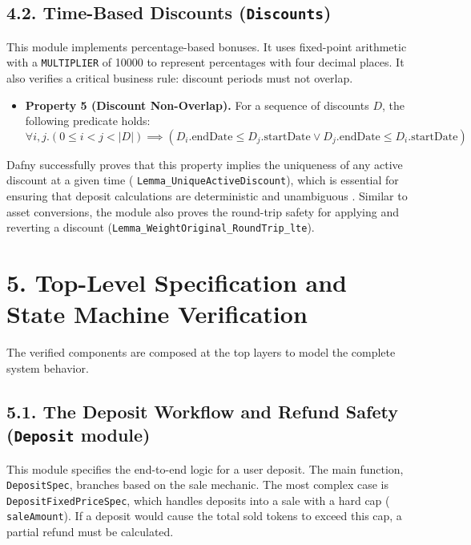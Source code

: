 \documentclass[
  english,
  onecolumn]{article}
\providecommand{\tightlist}{%
  \setlength{\itemsep}{0pt}\setlength{\parskip}{0pt}}
\begin{document}
\subsection{\texorpdfstring{4.2. Time-Based Discounts
(\texttt{Discounts})}{4.2. Time-Based Discounts (Discounts)}}\label{time-based-discounts-discounts}

This module implements percentage-based bonuses. It uses fixed-point
arithmetic with a \texttt{MULTIPLIER} of 10000 to represent percentages
with four decimal places. It also verifies a critical business rule:
discount periods must not overlap.

\begin{itemize}
\tightlist
\item
  \textbf{Property 5 (Discount Non-Overlap).} For a sequence of
  discounts \(D\), the following predicate holds:
  \[ \forall i, j. (0 \le i < j < |D|) \implies (D_i.\text{endDate} \le D_j.\text{startDate} \lor D_j.\text{endDate} \le D_i.\text{startDate}) \]
\end{itemize}

Dafny successfully proves that this property implies the uniqueness of
any active discount at a given time (
\texttt{Lemma\_UniqueActiveDiscount}), which is essential for ensuring
that deposit calculations are deterministic and unambiguous
\citep{grishchenko2018semantic}. Similar to asset conversions, the
module also proves the round-trip safety for applying and reverting a
discount (\texttt{Lemma\_WeightOriginal\_RoundTrip\_lte}).

\section{5. Top-Level Specification and State Machine
Verification}\label{top-level-specification-and-state-machine-verification}

The verified components are composed at the top layers to model the
complete system behavior.

\subsection{\texorpdfstring{5.1. The Deposit Workflow and Refund Safety
(\texttt{Deposit}
module)}{5.1. The Deposit Workflow and Refund Safety (Deposit module)}}\label{the-deposit-workflow-and-refund-safety-deposit-module}

This module specifies the end-to-end logic for a user deposit. The main
function, \texttt{DepositSpec}, branches based on the sale mechanic. The
most complex case is \texttt{DepositFixedPriceSpec}, which handles
deposits into a sale with a hard cap ( \texttt{saleAmount}). If a
deposit would cause the total sold tokens to exceed this cap, a partial
refund must be calculated.
\end{document}

